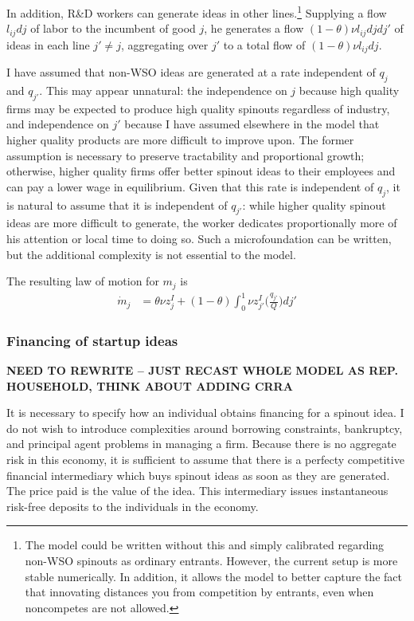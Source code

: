 \documentclass[12pt,english]{article}
\theoremstyle{remark}
\begin{document}
In addition, R\&D workers can generate ideas in other lines.\footnote{The model could be written without this and simply calibrated regarding non-WSO spinouts as ordinary entrants. However, the current setup is more stable numerically. In addition, it allows the model to better capture the fact that innovating distances you from competition by entrants, even when noncompetes are not allowed.} Supplying a flow $l_{ij}dj$ of labor to the incumbent of good $j$, he generates a flow $(1-\theta)\nu l_{ij} dj dj'$ of ideas in each line $j' \ne j$, aggregating over $j'$ to a total flow of $(1-\theta) \nu l_{ij} dj$.

I have assumed that non-WSO ideas are generated at a rate independent of $q_j$ and $q_{j'}$. This may appear unnatural: the independence on $j$ because high quality firms may be expected to produce high quality spinouts regardless of industry, and independence on $j'$ because I have assumed elsewhere in the model that higher quality products are more difficult to improve upon. The former assumption is necessary to preserve tractability and proportional growth; otherwise, higher quality firms offer better spinout ideas to their employees and can pay a lower wage in equilibrium. Given that this rate is independent of $q_j$, it is natural to assume that it is independent of $q_{j'}$: while higher quality spinout ideas are more difficult to generate, the worker dedicates proportionally more of his attention or local time to doing so. Such a microfoundation can be written, but the additional complexity is not essential to the model. 

The resulting law of motion for $m_j$ is 
\begin{align}
\dot{m}_j &= \theta \nu z^I_j + (1-\theta) \int_0^1 \nu z^I_{j'} \Big(\frac{q_{j'}}{Q} \Big)dj' \label{m_law_of_motion}
\end{align}

\subsubsection{Financing of startup ideas}

\textbf{NEED TO REWRITE -- JUST RECAST WHOLE MODEL AS REP. HOUSEHOLD, THINK ABOUT ADDING CRRA}

It is necessary to specify how an individual obtains financing for a spinout idea. I do not wish to introduce complexities around borrowing constraints, bankruptcy, and principal agent problems in managing a firm. Because there is no aggregate risk in this economy, it is sufficient to assume that there is a perfecty competitive financial intermediary which buys spinout ideas as soon as they are generated. The price paid is the value of the idea. This intermediary issues instantaneous risk-free deposits to the individuals in the economy.
\end{document}
